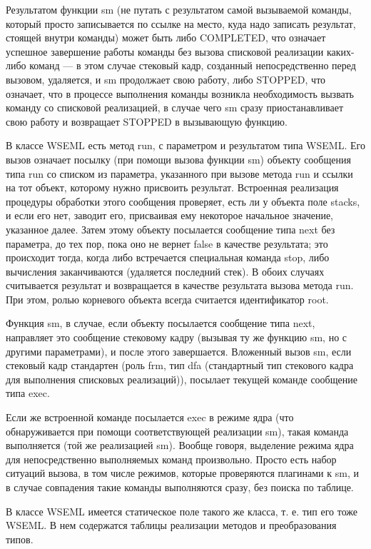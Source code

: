 \documentclass{report}
\begin{document}
    Результатом функции sm (не путать с результатом самой вызываемой команды, который просто записывается по ссылке на место, куда надо записать результат, стоящей внутри команды) может быть либо COMPLETED, что означает успешное завершение работы команды без вызова списковой реализации каких-либо команд --- в этом случае стековый кадр, созданный непосредственно перед вызовом, удаляется, и sm продолжает свою работу, либо STOPPED, что означает, что в процессе выполнения команды возникла необходимость вызвать команду со списковой реализацией, в случае чего sm сразу приостанавливает свою работу и возвращает STOPPED в вызывающую функцию.

    В классе WSEML есть метод run, с параметром и результатом типа WSEML. Его вызов означает посылку (при помощи вызова функции sm) объекту сообщения типа run со списком из параметра, указанного при вызове метода run и ссылки на тот объект, которому нужно присвоить результат. Встроенная реализация процедуры обработки этого сообщения проверяет, есть ли у объекта поле stacks, и если его нет, заводит его, присваивая ему некоторое начальное значение, указанное далее. Затем этому объекту посылается сообщение типа next без параметра, до тех пор, пока оно не вернет false в качестве результата; это происходит тогда, когда либо встречается специальная команда stop, либо вычисления заканчиваются (удаляется последний стек). В обоих случаях считывается результат и возвращается в качестве результата вызова метода run. При этом, ролью корневого объекта всегда считается идентификатор root.

    Функция sm, в случае, если объекту посылается сообщение типа next, направляет это сообщение стековому кадру (вызывая ту же функцию sm, но с другими параметрами), и после этого завершается. Вложенный вызов sm, если стековый кадр стандартен (роль frm, тип dfa (стандартный тип стекового кадра для выполнения списковых реализаций)), посылает текущей команде сообщение типа exec.

    Если же встроенной команде посылается exec в режиме ядра (что обнаруживается при помощи соответствующей реализации sm), такая команда выполняется (той же реализацией sm). Вообще говоря, выделение режима ядра для непосредственно выполняемых команд произвольно. Просто есть набор ситуаций вызова, в том числе режимов, которые проверяются плагинами к sm, и в случае совпадения такие команды выполняются сразу, без поиска по таблице.

    В классе WSEML имеется статическое поле такого же класса, т. е. тип его тоже WSEML. В нем содержатся таблицы реализации методов и преобразования типов.
\end{document}
